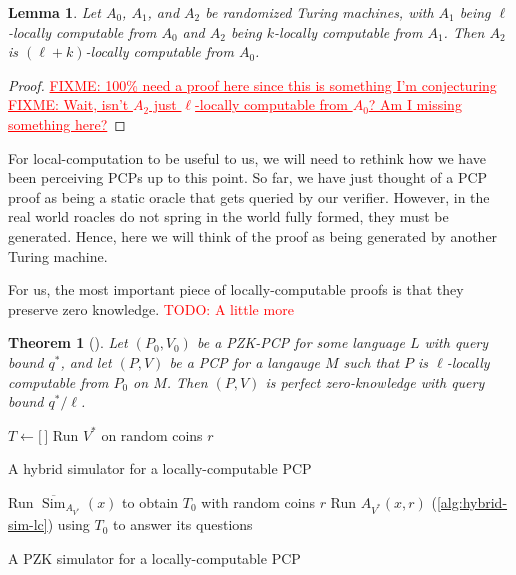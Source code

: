 \documentclass[english,12pt]{reedthesis}
\theoremstyle{plain}
\newtheorem{thm}{Theorem}[section]
\newtheorem{lemma}[lemma]{Lemma}
\theoremstyle{definition}
\theoremstyle{remark}
\DeclareMathOperator{\Sim}{Sim}
\newcommand{\TODO}[1]{\textcolor{red}{TODO: #1}}
\newcommand{\FIXME}[1]{\textcolor{red}{\ul{FIXME: #1}}}
\begin{document}
\begin{lemma}
  Let $A_{0}$, $A_{1}$, and $A_{2}$ be randomized Turing machines, with $A_{1}$
  being $\ell$-locally computable from $A_{0}$ and $A_{2}$ being $k$-locally
  computable from $A_{1}$. Then $A_{2}$ is $(\ell+k)$-locally computable from
  $A_{0}$.
\end{lemma}

\begin{proof}
  \FIXME{100\% need a proof here since this is something I'm conjecturing}
  \FIXME{Wait, isn't $A_{2}$ just $\ell$-locally computable from $A_{0}$? Am I
    missing something here?}
\end{proof}

For local-computation to be useful to us, we will need to rethink how we have
been perceiving PCPs up to this point. So far, we have just thought of a PCP
proof as being a static oracle that gets queried by our verifier. However, in
the real world roacles do not spring in the world fully formed, they must be
generated. Hence, here we will think of the proof as being generated by another
Turing machine.

For us, the most important piece of locally-computable proofs is that they
preserve zero knowledge. \TODO{A little more}

\begin{thm}[{\cite[Lemma 3.2]{GOS25}}]\label{thm:local-comp-pzk}
  Let $(P_{0}, V_{0})$ be a PZK-PCP for some language $L$ with query bound
  $q^{*}$, and let $(P, V)$ be a PCP for a langauge $M$ such that $P$ is
  $\ell$-locally computable from $P_{0}$ on $M$. Then $(P, V)$ is perfect
  zero-knowledge with query bound $q^{*}/\ell$.
\end{thm}

\begin{algorithm}[htbp]
  $T \leftarrow \lbrack\,\rbrack$\;
  Run $V^{*}$ on random coins $r$\;
  \;
  \caption{A hybrid simulator for a locally-computable PCP~\cite[Construction
    3.3]{GOS25}}\label{alg:hybrid-sim-lc}
\end{algorithm}

\begin{algorithm}[htbp]
  Run $\overline{\Sim}_{A_{V^{*}}}(x)$ to obtain $T_{0}$ with random coins $r$\;
  Run $A_{V^{*}}(x, r)$ (\cref{alg:hybrid-sim-lc}) using $T_{0}$ to answer its
  questions\;
  \;
  \caption{A PZK simulator for a locally-computable PCP~\cite[Construction
    3.4]{GOS25}}\label{alg:pzk-sim-lc}
\end{algorithm}
\end{document}
